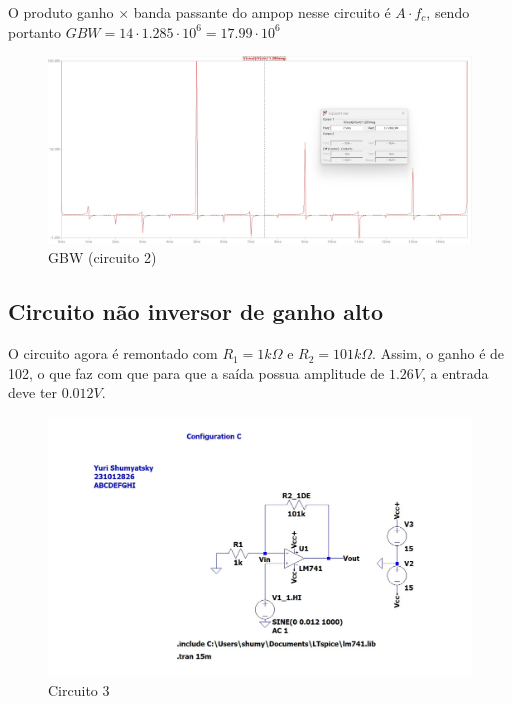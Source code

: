 \documentclass[10pt,twocolumn,letterpaper]{article}
\begin{document}
O produto ganho $\times$ banda passante do ampop nesse circuito é $A\cdot f_c$, sendo portanto $GBW = 14\cdot1.285\cdot10^6=17.99\cdot10^6$

\begin{figure}[h]
\caption{GBW (circuito 2)}
\begin{center}
\includegraphics[scale=0.15]{figuras/fig10}
\end{center}
\end{figure}

\subsection{Circuito não inversor de ganho alto}

O circuito agora é remontado com $R_1=1k\Omega$ e $R_2=101k\Omega$. Assim, o ganho é de 102, o que faz com que para que a saída possua amplitude de $1.26V$, a entrada deve ter $0.012V$.

\begin{figure}[h]
\caption{Circuito 3}
\begin{center}
\includegraphics[scale=0.2]{figuras/fig11}
\end{center}
\end{figure}
\end{document}
